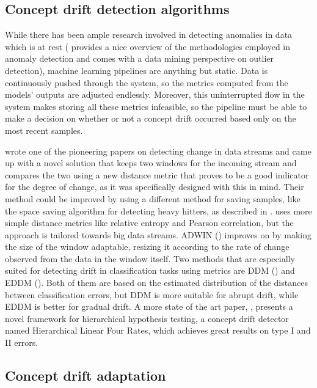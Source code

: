 \documentclass[12pt]{extreport}
\begin{document}
\subsection{Concept drift detection algorithms} \label{sec:cda}

While there has been ample research involved in detecting anomalies in data which is at rest (\cite{survey-outlier-detection} provides a nice overview of the methodologies employed in anomaly detection and \cite{there-and-back-again} comes with a data mining perspective on outlier detection), machine learning pipelines are anything but static. Data is continuously pushed through the system, so the metrics computed from the models’ outputs are adjusted endlessly. Moreover, this uninterrupted flow in the system makes storing all these metrics infeasible, so the pipeline must be able to make a decision on whether or not a concept drift occurred based only on the most recent samples.

\cite{detecting-change-in-data-streams} wrote one of the pioneering papers on detecting change in data streams and came up with a novel solution that keeps two windows for the incoming stream and compares the two using a new distance metric that proves to be a good indicator for the degree of change, as it was specifically designed with this in mind. Their method could be improved by using a different method for saving samples, like the space saving algorithm for detecting heavy hitters, as described in \cite{hierarchical-heavy-hitters}. \cite{onlineanomalydetection} uses more simple distance metrics like relative entropy and Pearson correlation, but the approach is tailored towards big data streams. ADWIN (\cite{adwin}) improves on \cite{detecting-change-in-data-streams} by making the size of the window adaptable, resizing it according to the rate of change observed from the data in the window itself. Two methods that are especially suited for detecting drift in classification tasks using metrics are DDM (\cite{ddm}) and EDDM (\cite{eddm}). Both of them are based on the estimated distribution of the distances between classification errors, but DDM is more suitable for abrupt drift, while EDDM is better for gradual drift. A more state of the art paper, \cite{hht}, presents a novel framework for hierarchical hypothesis testing, a concept drift detector named Hierarchical Linear Four Rates, which achieves great results on type I and II errors.

\subsection{Concept drift adaptation}
\end{document}
